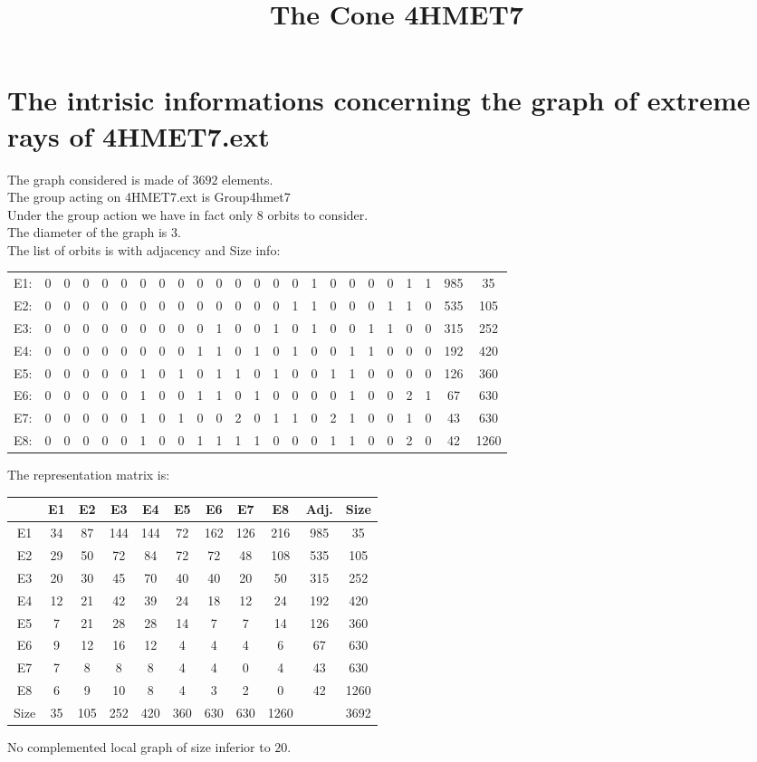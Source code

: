 \documentclass[12pt]{article}
\title{The Cone 4HMET7}
\begin{document}
\maketitle
\section{The intrisic informations concerning the graph of extreme rays of 4HMET7.ext}
The graph considered is made of $3692$ elements.\\
The group acting on 4HMET7.ext is Group4hmet7\\
Under the group action we have in fact only $8$ orbits to consider.\\
The diameter of the graph is $3$.\\
The list of orbits is with adjacency and Size info:
\begin{center}
\scriptsize
\begin{tabular}{cccccccccccccccccccccc|c|c}
E1:&0&0&0&0&0&0&0&0&0&0&0&0&0&0&1&0&0&0&0&1&1&985&35\\
E2:&0&0&0&0&0&0&0&0&0&0&0&0&0&1&1&0&0&0&1&1&0&535&105\\
E3:&0&0&0&0&0&0&0&0&0&1&0&0&1&0&1&0&0&1&1&0&0&315&252\\
E4:&0&0&0&0&0&0&0&0&1&1&0&1&0&1&0&0&1&1&0&0&0&192&420\\
E5:&0&0&0&0&0&1&0&1&0&1&1&0&1&0&0&1&1&0&0&0&0&126&360\\
E6:&0&0&0&0&0&1&0&0&1&1&0&1&0&0&0&0&1&0&0&2&1&67&630\\
E7:&0&0&0&0&0&1&0&1&0&0&2&0&1&1&0&2&1&0&0&1&0&43&630\\
E8:&0&0&0&0&0&1&0&0&1&1&1&1&0&0&0&1&1&0&0&2&0&42&1260\\
\end{tabular}
\end{center}
The representation matrix is:
\begin{center}
\scriptsize
\begin{tabular}{|c|cccccccc|c|c|}
\hline
&E1&E2&E3&E4&E5&E6&E7&E8&Adj.&Size\\
\hline
E1& 34& 87& 144& 144& 72& 162& 126& 216&985&35\\
E2& 29& 50& 72& 84& 72& 72& 48& 108&535&105\\
E3& 20& 30& 45& 70& 40& 40& 20& 50&315&252\\
E4& 12& 21& 42& 39& 24& 18& 12& 24&192&420\\
E5& 7& 21& 28& 28& 14& 7& 7& 14&126&360\\
E6& 9& 12& 16& 12& 4& 4& 4& 6&67&630\\
E7& 7& 8& 8& 8& 4& 4& 0& 4&43&630\\
E8& 6& 9& 10& 8& 4& 3& 2& 0&42&1260\\
\hline
Size&35&105&252&420&360&630&630&1260&&3692\\
\hline
\end{tabular}
\end{center}
No complemented local graph of size inferior to $20$.
\end{document}

